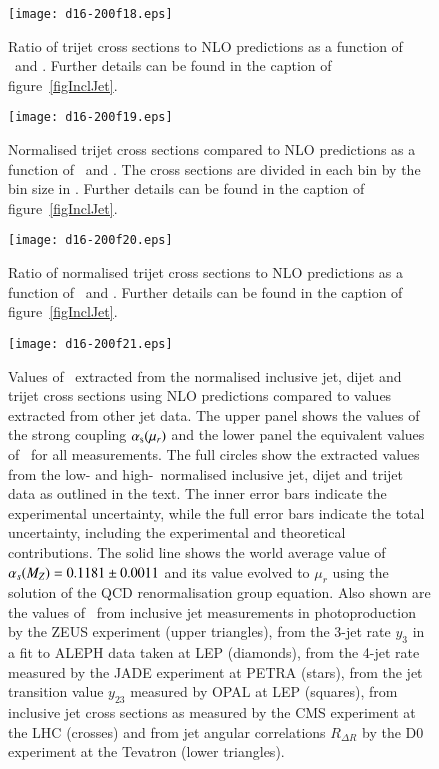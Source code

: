 \documentclass[12pt]{article}
\begin{document}
\begin{figure}[tbhp]
  \centering
  \texttt{[image: d16-200f18.eps]}
  \caption{
    Ratio of trijet cross sections to NLO predictions  as a function of \Qsq\ and \meanpttri.
    Further details can be found in the caption of figure~\ref{figInclJet}.
  }
  \label{figTrijetRatio}
\end{figure}

\begin{figure}[tbhp]
  \centering
  \texttt{[image: d16-200f19.eps]}
  \caption{
    Normalised trijet cross sections compared to NLO predictions as a function of \Qsq\ and \meanpttri.
    The cross sections are divided in each bin by the bin size in \meanpttri.
    Further details can be found in the caption of figure~\ref{figInclJet}.
  }
  \label{figNormTrijet}
\end{figure}

\begin{figure}
  \centering
  \texttt{[image: d16-200f20.eps]}
  \caption{
    Ratio of normalised trijet cross sections to NLO predictions  as a function of \Qsq\ and \meanpttri.
    Further details can be found in the caption of figure~\ref{figInclJet}.
  }
  \label{figNormTrijetRatio}
\end{figure}


\begin{figure}
  \centering
  \texttt{[image: d16-200f21.eps]}
  \caption{
  Values of \asmz\ extracted from the normalised inclusive jet, dijet and trijet cross sections
  using NLO predictions compared to values extracted from other jet data.
  The upper panel shows the values of the strong coupling $\alpha_{\rm s}(\mu_r)$ and the
  lower panel the equivalent values of \asmz\ for all measurements.
  The full circles show the extracted values from the low- and high-\Qsq\ normalised inclusive jet, dijet and trijet
  data as outlined in the text.
  The inner error bars indicate the experimental uncertainty, while the full error bars indicate the total uncertainty,
  including the experimental and theoretical contributions.
  The solid line shows the world average value of $\asmz = 0.1181\pm0.0011$ and its value evolved to $\mu_r$ using the solution of the QCD renormalisation
  group equation.
  Also shown are the values of \as\
  from inclusive jet measurements in photoproduction by the ZEUS experiment (upper triangles),
  from the 3-jet rate $y_3$ in a fit to ALEPH data taken at LEP (diamonds),
  from the 4-jet rate measured by the JADE experiment at PETRA (stars),
  from the jet transition value $y_{23}$ measured by OPAL at LEP (squares),
  from inclusive jet cross sections as measured by the CMS experiment at the LHC (crosses)
  and
  from jet angular correlations $R_{\Delta R}$ by the D0 experiment at the Tevatron (lower triangles).
  }
  \label{figAlphasRunning}
\end{figure}
\end{document}

